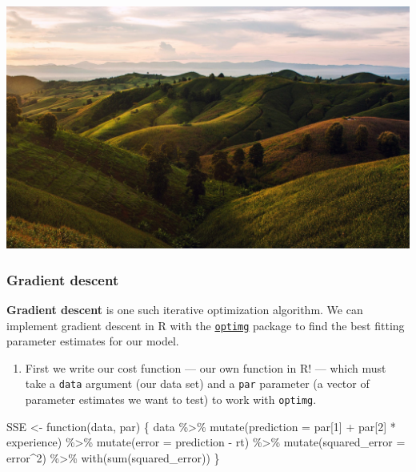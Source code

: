 \documentclass[
  letterpaper,
  DIV=11,
  numbers=noendperiod]{scrartcl}
\newenvironment{Shaded}{}{}
\newcommand{\AttributeTok}[1]{\textcolor[rgb]{0.84,0.23,0.29}{#1}}
\newcommand{\ControlFlowTok}[1]{\textcolor[rgb]{0.84,0.23,0.29}{#1}}
\newcommand{\DecValTok}[1]{\textcolor[rgb]{0.00,0.36,0.77}{#1}}
\newcommand{\FunctionTok}[1]{\textcolor[rgb]{0.44,0.26,0.76}{#1}}
\newcommand{\NormalTok}[1]{\textcolor[rgb]{0.14,0.16,0.18}{#1}}
\newcommand{\OtherTok}[1]{\textcolor[rgb]{0.44,0.26,0.76}{#1}}
\newcommand{\SpecialCharTok}[1]{\textcolor[rgb]{0.00,0.36,0.77}{#1}}
\providecommand{\tightlist}{%
  \setlength{\itemsep}{0pt}\setlength{\parskip}{0pt}}\usepackage{longtable,booktabs,array}
\begin{document}
\includegraphics{../assests/images/grad-desc-intuition.jpeg}

\subsubsection{Gradient descent}\label{gradient-descent}

\textbf{Gradient descent} is one such iterative optimization algorithm.
We can implement gradient descent in R with the
\href{https://www.rdocumentation.org/packages/optimg/versions/0.1.2/topics/optimg}{\texttt{optimg}}
package to find the best fitting parameter estimates for our model.

\begin{enumerate}
\def\labelenumi{\arabic{enumi}.}
\tightlist
\item
  First we write our cost function --- our own function in R! --- which
  must take a \texttt{data} argument (our data set) and a \texttt{par}
  parameter (a vector of parameter estimates we want to test) to work
  with \texttt{optimg}.
\end{enumerate}

\begin{Shaded}
\begin{Highlighting}[]
\NormalTok{SSE }\OtherTok{\textless{}{-}} \ControlFlowTok{function}\NormalTok{(data, par) \{}
\NormalTok{    data }\SpecialCharTok{\%\textgreater{}\%}
        \FunctionTok{mutate}\NormalTok{(}\AttributeTok{prediction =}\NormalTok{ par[}\DecValTok{1}\NormalTok{] }\SpecialCharTok{+}\NormalTok{ par[}\DecValTok{2}\NormalTok{] }\SpecialCharTok{*}\NormalTok{ experience) }\SpecialCharTok{\%\textgreater{}\%}
        \FunctionTok{mutate}\NormalTok{(}\AttributeTok{error =}\NormalTok{ prediction }\SpecialCharTok{{-}}\NormalTok{ rt) }\SpecialCharTok{\%\textgreater{}\%}
        \FunctionTok{mutate}\NormalTok{(}\AttributeTok{squared\_error =}\NormalTok{ error}\SpecialCharTok{\^{}}\DecValTok{2}\NormalTok{) }\SpecialCharTok{\%\textgreater{}\%}
        \FunctionTok{with}\NormalTok{(}\FunctionTok{sum}\NormalTok{(squared\_error))}
\NormalTok{\}}
\end{Highlighting}
\end{Shaded}
\end{document}
